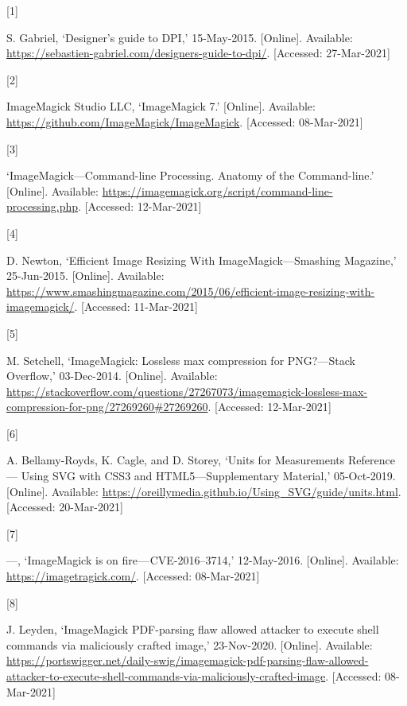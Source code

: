 \documentclass[
  11pt,
  british,
  a4paper,
]{article}
\newlength{\cslhangindent}
\newlength{\csllabelwidth}
\newenvironment{CSLReferences}[2] %
 {%
  \setlength{\parindent}{0pt}
  \ifodd #1 \everypar{\setlength{\hangindent}{\cslhangindent}}\ignorespaces\fi
  \ifnum #2 > 0
  \setlength{\parskip}{#2\baselineskip}
  \fi
 }%
 {}
\newcommand{\CSLLeftMargin}[1]{\parbox[t]{\csllabelwidth}{#1}}
\newcommand{\CSLRightInline}[1]{\parbox[t]{\linewidth - \csllabelwidth}{#1}\break}
\begin{document}
\hypertarget{refs}{}
\begin{CSLReferences}{0}{0}
\leavevmode{}%
\CSLLeftMargin{{[}1{]} }
\CSLRightInline{S. Gabriel, {`{Designer's guide to DPI},'} 15-May-2015.
{[}Online{]}. Available:
\url{https://sebastien-gabriel.com/designers-guide-to-dpi/}.
{[}Accessed: 27-Mar-2021{]}}

\leavevmode{}%
\CSLLeftMargin{{[}2{]} }
\CSLRightInline{ImageMagick Studio LLC, {`ImageMagick 7.'} {[}Online{]}.
Available: \url{https://github.com/ImageMagick/ImageMagick}.
{[}Accessed: 08-Mar-2021{]}}

\leavevmode{}%
\CSLLeftMargin{{[}3{]} }
\CSLRightInline{{`{ImageMagick---Command-line Processing}. {Anatomy of
the Command-line}.'} {[}Online{]}. Available:
\url{https://imagemagick.org/script/command-line-processing.php}.
{[}Accessed: 12-Mar-2021{]}}

\leavevmode{}%
\CSLLeftMargin{{[}4{]} }
\CSLRightInline{D. Newton, {`{Efficient Image Resizing With
ImageMagick---Smashing Magazine},'} 25-Jun-2015. {[}Online{]}.
Available:
\url{https://www.smashingmagazine.com/2015/06/efficient-image-resizing-with-imagemagick/}.
{[}Accessed: 11-Mar-2021{]}}

\leavevmode{}%
\CSLLeftMargin{{[}5{]} }
\CSLRightInline{M. Setchell, {`{ImageMagick: Lossless max compression
for PNG?---Stack Overflow},'} 03-Dec-2014. {[}Online{]}. Available:
\url{https://stackoverflow.com/questions/27267073/imagemagick-lossless-max-compression-for-png/27269260\#27269260}.
{[}Accessed: 12-Mar-2021{]}}

\leavevmode{}%
\CSLLeftMargin{{[}6{]} }
\CSLRightInline{A. Bellamy-Royds, K. Cagle, and D. Storey, {`{Units for
Measurements Reference --- Using SVG with CSS3 and HTML5---Supplementary
Material},'} 05-Oct-2019. {[}Online{]}. Available:
\url{https://oreillymedia.github.io/Using_SVG/guide/units.html}.
{[}Accessed: 20-Mar-2021{]}}

\leavevmode{}%
\CSLLeftMargin{{[}7{]} }
\CSLRightInline{---, {`ImageMagick is on fire --- CVE-2016--3714,'}
12-May-2016. {[}Online{]}. Available: \url{https://imagetragick.com/}.
{[}Accessed: 08-Mar-2021{]}}

\leavevmode{}%
\CSLLeftMargin{{[}8{]} }
\CSLRightInline{J. Leyden, {`ImageMagick PDF-parsing flaw allowed
attacker to execute shell commands via maliciously crafted image,'}
23-Nov-2020. {[}Online{]}. Available:
\url{https://portswigger.net/daily-swig/imagemagick-pdf-parsing-flaw-allowed-attacker-to-execute-shell-commands-via-maliciously-crafted-image}.
{[}Accessed: 08-Mar-2021{]}}


\end{CSLReferences}
\end{document}
